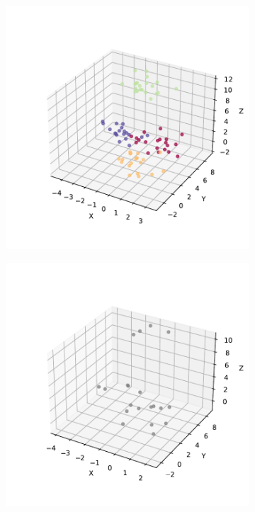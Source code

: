 \begin{figure}[p]
  \centering
  \begin{subfigure}{0.45\textwidth}
    \centering
    \includegraphics[width=\textwidth]{figures/train-asig-artificial.pdf}
    \caption{}
    \label{fig:train-artificial}
  \end{subfigure}
  \begin{subfigure}{0.45\textwidth}
    \centering
    \includegraphics[width=\textwidth]{figures/test-artificial.pdf}

\end{subfigure}
\end{figure}
